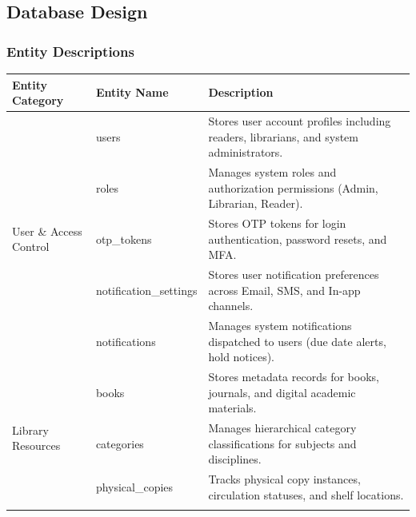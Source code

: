 \subsection{Database Design}
\subsubsection{Entity Descriptions}

\begin{table}[H]
	\centering
	\begin{tabular}{|p{4cm}|p{4cm}|p{7cm}|}
		\hline
		\textbf{Entity Category} & \textbf{Entity Name}   & \textbf{Description}                                                                   \\ \hline

		\multirow{5}{*}{User \& Access Control}
		                         & users                  & Stores user account profiles including readers, librarians, and system administrators. \\ \cline{2-3}
		                         & roles                  & Manages system roles and authorization permissions (Admin, Librarian, Reader).         \\ \cline{2-3}
		                         & otp\_tokens            & Stores OTP tokens for login authentication, password resets, and MFA.                  \\ \cline{2-3}
		                         & notification\_settings & Stores user notification preferences across Email, SMS, and In-app channels.           \\ \cline{2-3}
		                         & notifications          & Manages system notifications dispatched to users (due date alerts, hold notices).      \\ \hline

		\multirow{5}{*}{Library Resources}
		                         & books                  & Stores metadata records for books, journals, and digital academic materials.           \\ \cline{2-3}
		                         & categories             & Manages hierarchical category classifications for subjects and disciplines.            \\ \cline{2-3}
		                         & physical\_copies       & Tracks physical copy instances, circulation statuses, and shelf locations.             \\ \cline{2-3}


\end{tabular}
\end{table}
